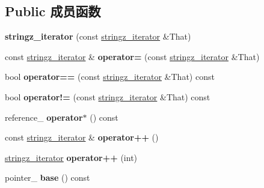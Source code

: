 \subsection*{Public 成员函数}
\begin{DoxyCompactItemize}
\item 
\mbox{\label{classkjk_1_1stringz__iterator_a57f8a1e584a1b20f2d7f5e6127ccb8a6}} 
{\bfseries stringz\+\_\+iterator} (const \hyperlink{classkjk_1_1stringz__iterator}{stringz\+\_\+iterator} \&That)
\item 
\mbox{\label{classkjk_1_1stringz__iterator_aa20987448e9fea792a62bef3a3023340}} 
const \hyperlink{classkjk_1_1stringz__iterator}{stringz\+\_\+iterator} \& {\bfseries operator=} (const \hyperlink{classkjk_1_1stringz__iterator}{stringz\+\_\+iterator} \&That)
\item 
\mbox{\label{classkjk_1_1stringz__iterator_a38440475b1029faab1bb9e1acbeac7c0}} 
bool {\bfseries operator==} (const \hyperlink{classkjk_1_1stringz__iterator}{stringz\+\_\+iterator} \&That) const
\item 
\mbox{\label{classkjk_1_1stringz__iterator_adc2e68b3027a56e766be25769b851668}} 
bool {\bfseries operator!=} (const \hyperlink{classkjk_1_1stringz__iterator}{stringz\+\_\+iterator} \&That) const
\item 
\mbox{\label{classkjk_1_1stringz__iterator_a412e462717c8bcbf551f2e7d9dc37410}} 
reference\+\_\+ {\bfseries operator$\ast$} () const
\item 
\mbox{\label{classkjk_1_1stringz__iterator_a4fe1faa8b46ef7fe756c3aca3b5928a2}} 
const \hyperlink{classkjk_1_1stringz__iterator}{stringz\+\_\+iterator} \& {\bfseries operator++} ()
\item 
\mbox{\label{classkjk_1_1stringz__iterator_a3bbda0e37c4453f9a6a01c9e8efb139d}} 
\hyperlink{classkjk_1_1stringz__iterator}{stringz\+\_\+iterator} {\bfseries operator++} (int)
\item 
\mbox{\label{classkjk_1_1stringz__iterator_a6cbe9841d61c30a920b0c8abd9d21fa6}} 
pointer\+\_\+ {\bfseries base} () const
\end{DoxyCompactItemize}
